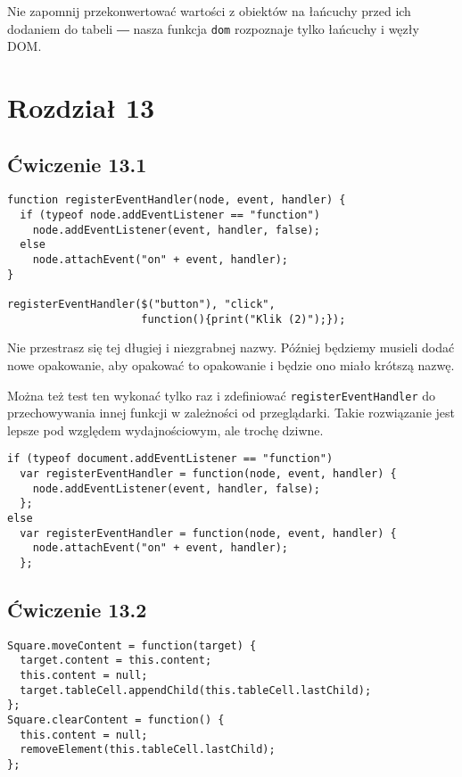 Nie zapomnij przekonwertować wartości z obiektów na łańcuchy przed ich dodaniem do tabeli ― nasza funkcja \texttt{dom} rozpoznaje tylko łańcuchy i węzły DOM.


\section*{Rozdział 13}
\label{sol:13}
 
\subsection*{Ćwiczenie 13.1}
\label{sol:13.1}   
    
\begin{verbatim} 
function registerEventHandler(node, event, handler) {
  if (typeof node.addEventListener == "function")
    node.addEventListener(event, handler, false);
  else
    node.attachEvent("on" + event, handler);
}

registerEventHandler($("button"), "click",
                     function(){print("Klik (2)");});
\end{verbatim}
    
Nie przestrasz się tej długiej i niezgrabnej nazwy. Później będziemy musieli dodać nowe opakowanie, aby opakować to opakowanie i będzie ono miało krótszą nazwę.

    
Można też test ten wykonać tylko raz i zdefiniować \texttt{registerEventHandler} do przechowywania innej funkcji w zależności od przeglądarki. Takie rozwiązanie jest lepsze pod względem wydajnościowym, ale trochę dziwne.

    
\begin{verbatim} 
if (typeof document.addEventListener == "function")
  var registerEventHandler = function(node, event, handler) {
    node.addEventListener(event, handler, false);
  };
else
  var registerEventHandler = function(node, event, handler) {
    node.attachEvent("on" + event, handler);
  };
\end{verbatim}

  
\subsection*{Ćwiczenie 13.2}
\label{sol:13.2}
 
    
\begin{verbatim} 
Square.moveContent = function(target) {
  target.content = this.content;
  this.content = null;
  target.tableCell.appendChild(this.tableCell.lastChild);
};
Square.clearContent = function() {
  this.content = null;
  removeElement(this.tableCell.lastChild);
};
 \end{verbatim}
  
